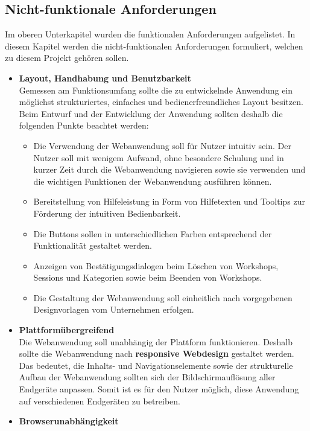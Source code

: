 \subsection{Nicht-funktionale Anforderungen}
\label{sec:nicht-funktionale anforderungen}
Im oberen Unterkapitel wurden die funktionalen Anforderungen aufgelistet. In diesem Kapitel werden die nicht-funktionalen Anforderungen formuliert, welchen zu diesem Projekt gehören sollen.

\begin{itemize}
\item \textbf{Layout, Handhabung und Benutzbarkeit}\\
Gemessen am Funktionsumfang sollte die zu entwickelnde Anwendung ein möglichst strukturiertes, einfaches und bedienerfreundliches Layout besitzen. Beim Entwurf und der Entwicklung der Anwendung sollten deshalb die folgenden Punkte beachtet werden:
\begin{itemize}
\item Die Verwendung der Webanwendung soll für Nutzer intuitiv sein. Der Nutzer soll mit wenigem Aufwand, ohne besondere Schulung und in kurzer Zeit durch die Webanwendung navigieren sowie sie verwenden und die wichtigen Funktionen der Webanwendung ausführen können.
\item Bereitstellung von Hilfeleistung in Form von Hilfetexten und Tooltips zur Förderung der intuitiven Bedienbarkeit.
\item Die Buttons sollen in unterschiedlichen Farben entsprechend der Funktionalität gestaltet werden.
\item Anzeigen von Bestätigungsdialogen beim Löschen von Workshops, Sessions und Kategorien sowie beim Beenden von Workshops.
\item Die Gestaltung der Webanwendung soll einheitlich nach vorgegebenen Designvorlagen vom Unternehmen erfolgen.
\end{itemize}
\item \textbf{Plattformübergreifend}\\
Die Webanwendung soll unabhängig der Plattform funktionieren. Deshalb sollte die Webanwendung nach \textbf{responsive Webdesign} gestaltet werden. Das bedeutet, die Inhalts- und Navigationselemente sowie der strukturelle Aufbau der Webanwendung sollten sich der Bildschirmauflösung aller Endgeräte anpassen. Somit ist es für den Nutzer möglich, diese Anwendung auf verschiedenen Endgeräten zu betreiben.
\item \textbf{Browserunabhängigkeit}\\

\end{itemize}

